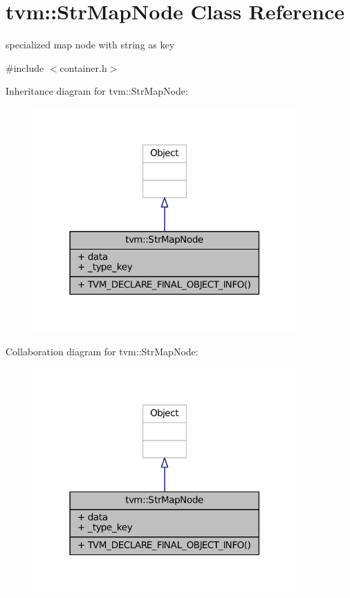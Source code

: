 \hypertarget{classtvm_1_1StrMapNode}{}\section{tvm\+:\+:Str\+Map\+Node Class Reference}
\label{classtvm_1_1StrMapNode}


specialized map node with string as key  




{\ttfamily \#include $<$container.\+h$>$}



Inheritance diagram for tvm\+:\+:Str\+Map\+Node\+:
\nopagebreak
\begin{figure}[H]
\begin{center}
\leavevmode
\includegraphics[width=285pt]{classtvm_1_1StrMapNode__inherit__graph}
\end{center}
\end{figure}


Collaboration diagram for tvm\+:\+:Str\+Map\+Node\+:
\nopagebreak
\begin{figure}[H]
\begin{center}
\leavevmode
\includegraphics[width=285pt]{classtvm_1_1StrMapNode__coll__graph}
\end{center}
\end{figure}
